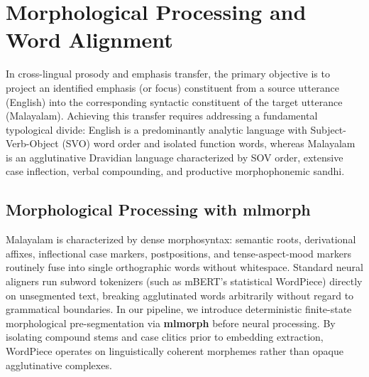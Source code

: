 \chapter[Morphological Processing and Cross-Lingual Word Alignment]{Morphological Processing and\\Word Alignment}
\label{chap:morph_alignment}

In cross-lingual prosody and emphasis transfer, the primary objective is to project an identified emphasis (or focus) constituent from a source utterance (English) into the corresponding syntactic constituent of the target utterance (Malayalam). Achieving this transfer requires addressing a fundamental typological divide: English is a predominantly analytic language with Subject-Verb-Object (SVO) word order and isolated function words, whereas Malayalam is an agglutinative Dravidian language characterized by SOV order, extensive case inflection, verbal compounding, and productive morphophonemic sandhi.




\section{Morphological Processing with mlmorph}
\label{sec:mlmorph_overview}

Malayalam is characterized by dense morphosyntax: semantic roots, derivational affixes, inflectional case markers, postpositions, and tense-aspect-mood markers routinely fuse into single orthographic words without whitespace. Standard neural aligners run subword tokenizers (such as mBERT's statistical WordPiece) directly on unsegmented text, breaking agglutinated words arbitrarily without regard to grammatical boundaries. In our pipeline, we introduce deterministic finite-state morphological pre-segmentation via \textbf{mlmorph} \citep{thottingal2019finite} before neural processing. By isolating compound stems and case clitics prior to embedding extraction, WordPiece operates on linguistically coherent morphemes rather than opaque agglutinative complexes.

